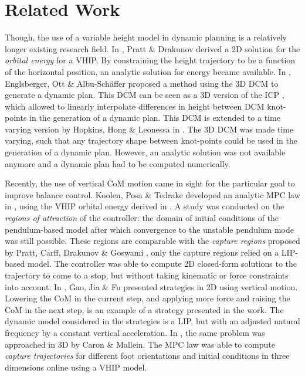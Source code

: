 \section{Related Work}
Though, the use of a variable height model in dynamic planning is a relatively longer existing research field. In \cite{pratt2007derivation}, Pratt \& Drakunov derived a \ac{2D} solution for the \textit{orbital energy} for a \ac{VHIP}. By constraining the height trajectory to be a function of the horizontal position, an analytic solution for energy became available. In \cite{englsberger2013three}, Englsberger, Ott \& Albu-Sch{\"a}ffer proposed a method using the \ac{3D} \ac{DCM} to generate a dynamic plan. This \ac{DCM} can be seen as a \ac{3D} version of the \ac{ICP} \cite{koolen2012capturability}, which allowed to linearly interpolate differences in height between \ac{DCM} knot-points in the generation of a dynamic plan.  This \ac{DCM} is extended to a time varying version by Hopkins, Hong \& Leonessa in \cite{hopkins2014humanoid}. The \ac{3D} \ac{DCM} was made time varying, such that any trajectory shape between knot-points could be used in the generation of a dynamic plan. However, an analytic solution was not available anymore and a dynamic plan had to be computed numerically. 

Recently, the use of vertical \ac{CoM} motion came in sight for the particular goal to improve balance control. Koolen, Posa \& Tedrake developed an analytic \ac{MPC} law in \cite{koolen2016balance}, using the \ac{VHIP} orbital energy derived in \cite{pratt2007derivation}. A study was conducted on the \textit{regions of attraction} of the controller: the domain of initial conditions of the pendulum-based model after which convergence to the unstable pendulum mode was still possible. These regions are comparable with the \textit{capture regions} proposed by Pratt, Carff, Drakunov \& Goswami \cite{pratt2006capture}, only the capture regions relied on a \ac{LIP}-based model. The controller was able to compute \ac{2D} closed-form solutions to the trajectory to come to a stop, but without taking kinematic or force constraints into account. In \cite{gao2017increase}, Gao, Jia \& Fu presented strategies in \ac{2D} using vertical motion. Lowering the \ac{CoM} in the current step, and applying more force and raising the \ac{CoM} in the next step, is an example of a strategy presented in the work. The dynamic model considered in the strategies is a \ac{LIP}, but with an adjusted natural frequency by a constant vertical acceleration. In \cite{caron2018balance}, the same problem was approached in \ac{3D} by Caron \& Mallein. The \ac{MPC} law was able to compute \textit{capture trajectories} for different foot orientations and initial conditions in three dimensions online using a \ac{VHIP} model.

